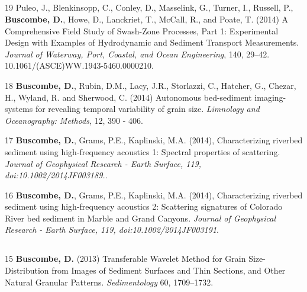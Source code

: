\documentclass[margin,line]{resume}
\begin{document}
\begin{resume}
\begin{footnotesize}
\begin{list1}
	\end{list1}
	
	\subsection{}
	\begin{list1}
        \item[19] Puleo, J., Blenkinsopp, C., Conley, D., Masselink, G., Turner, I., Russell, P., {\bf Buscombe, D.}, Howe, D., Lanckriet, T., McCall, R., and Poate, T. (2014) A Comprehensive Field Study of Swash-Zone Processes, Part 1: Experimental Design with Examples of Hydrodynamic and Sediment Transport Measurements. {\sl Journal of Waterway, Port, Coastal, and Ocean Engineering}, 140, 29–42. 10.1061/(ASCE)WW.1943-5460.0000210.\\

	\item[18]  {\bf Buscombe, D.}, Rubin, D.M., Lacy, J.R., Storlazzi, C., Hatcher, G., Chezar, H., Wyland, R. and Sherwood, C. (2014) Autonomous bed-sediment imaging-systems for revealing temporal variability of grain size. {\sl Limnology and Oceanography: Methods}, 12, 390 - 406. \\

	\item[17] {\bf Buscombe, D.}, Grams, P.E., Kaplinski, M.A. (2014), Characterizing riverbed sediment using high-frequency acoustics 1: Spectral properties of scattering. {\sl Journal of Geophysical Research - Earth Surface, 119, doi:10.1002/2014JF003189.}.\\

	\item[16] {\bf Buscombe, D.}, Grams, P.E., Kaplinski, M.A. (2014), Characterizing riverbed sediment using high-frequency acoustics 2: Scattering signatures of Colorado River bed sediment in Marble and Grand Canyons. {\sl Journal of Geophysical Research - Earth Surface, 119, doi:10.1002/2014JF003191}.

	\end{list1}

	\subsection{}
	\begin{list1}
        \item[15] {\bf Buscombe, D.} (2013) Transferable Wavelet Method for Grain Size-Distribution from Images of Sediment Surfaces and Thin Sections, and Other Natural Granular Patterns. {\sl Sedimentology} 60, 1709--1732. 


\end{list1}
\end{footnotesize}
\end{resume}
\end{document}
